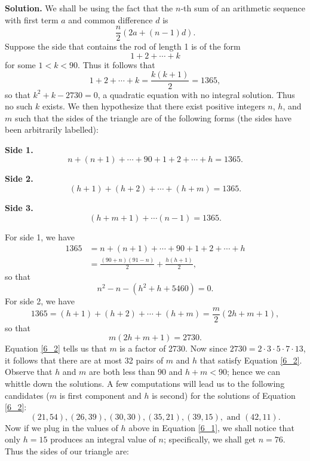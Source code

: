 \documentclass[9pt]{article}
\begin{document}
\begin{enumerate}
      \textbf{Solution.} We shall be using the fact that the $n$-th sum of an
      arithmetic sequence with first term $a$ and common difference $d$ is
      $$\frac{n}{2}(2a + (n-1)d).$$
      Suppose the side that contains the rod of length 1 is of the form
      $$1 + 2 + \cdots + k$$
      for some $1 < k < 90$. Thus it follows that
      $$1 + 2 + \cdots + k = \frac{k(k+1)}{2} = 1365,$$
      so that $k^2+k-2730=0$, a quadratic equation with no integral solution.
      Thus no such $k$ exists. We then hypothesize that there exist positive
      integers $n$, $h$, and $m$ such that the sides of the triangle are of the
      following forms (the sides have been arbitrarily labelled):
      
      \textbf{Side 1.}
      $$n + (n + 1) + \cdots + 90 + 1 + 2 + \cdots + h = 1365.$$
      
      \textbf{Side 2.}
      $$(h + 1) + (h + 2) + \cdots + (h + m) = 1365.$$
      
      \textbf{Side 3.}
      $$(h + m + 1) + \cdots (n - 1) = 1365.$$
      
      For side 1, we have
      \begin{align*}
         1365 &= n + (n + 1) + \cdots + 90 + 1 + 2 + \cdots + h \\
              &= \frac{(90 + n)(91 - n)}{2} + \frac{h(h+1)}{2},
      \end{align*}
      so that
      \begin{equation} \label{6_1}
         n^2 - n - (h^2+h+5460) = 0.
      \end{equation}
      For side 2, we have
      $$1365 = (h + 1) + (h + 2) + \cdots + (h + m) = \frac{m}{2}(2h+m+1),$$
      so that
      \begin{equation} \label{6_2}
         m(2h+m+1) = 2730.
      \end{equation}
      Equation \eqref{6_2} tells us that $m$ is a factor of 2730. Now since
      $2730 = 2 \cdot 3 \cdot 5 \cdot 7 \cdot 13$, it follows that there are
      at most 32 pairs of $m$ and $h$ that satisfy Equation \eqref{6_2}.
      Observe that $h$ and $m$ are both less than 90 and $h + m < 90$; hence we
      can whittle down the solutions. A few computations will lead us to the
      following candidates ($m$ is first component and $h$ is second) for the
      solutions of Equation  \eqref{6_2}:
      $$(21, 54), (26, 39), (30, 30), (35, 21), (39, 15), \text{ and }
        (42, 11).$$
      Now if we plug in the values of $h$ above in Equation \eqref{6_1}, we
      shall notice that only $h = 15$ produces an integral value of $n$;
      specifically, we shall get $n = 76$. Thus the sides of our triangle are:
      

\end{enumerate}
\end{document}
